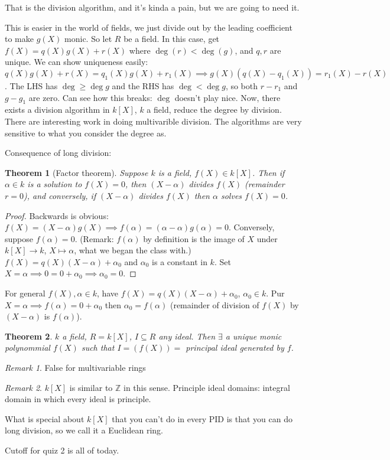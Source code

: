 \documentclass{article}
\theoremstyle{plain}
\newtheorem{theorem}{Theorem}
\theoremstyle{remark}
\newtheorem{remark}{Remark}
\newcommand{\Z}{{\mathbb Z}}
\begin{document}
That is the division algorithm, and it's kinda a pain,
but we are going to need it.

This is easier in the world of fields, we just divide out by the
leading coefficient to make $g(X)$ monic.
So let $R$ be a field.
In this case, get $f(X) = q(X)g(X) + r(X)$ where $\deg(r)<\deg(g)$,
and $q,r$ are unique.
We can show uniqueness easily:
$q(X)g(X) + r(X) = q_1(X)g(X) + r_1(X)
\implies g(X)(q(X)-q_1(X)) = r_1(X) - r(X)$.
The LHS has $\deg \geq \deg g$ and the RHS has $\deg < \deg g$,
so both $r-r_1$ and $g-g_1$ are zero.
Can see how this breaks: $\deg$ doesn't play nice.
Now, there exists a division algorithm in $k[X]$, $k$ a field,
reduce the degree by division.
There are interesting work in doing multivarible division.
The algorithms are very sensitive to what you consider the degree as.

Consequence of long division:
\begin{theorem}[Factor theorem]
	Suppose $k$ is a field, $f(X) \in k[X]$.
	Then if $\alpha \in k$ is a solution to $f(X) = 0$,
	then $(X-\alpha)$ divides $f(X)$ (remainder $r = 0$),
	and conversely, if $(X-\alpha)$ divides $f(X)$ then $\alpha$ solves $f(X) = 0$.
\end{theorem}
\begin{proof}
	Backwards is obvious: $f(X) = (X-\alpha)g(X) \implies f(\alpha) = (\alpha-\alpha)g(\alpha) = 0$.
	Conversely, suppose $f(\alpha) = 0$.
	(Remark: $f(\alpha)$ by definition is the image of $X$ under $k[X] \to k$, $X \mapsto \alpha$,
	what we began the class with.)
	$f(X) = q(X)(X-\alpha) + \alpha_0$ and $\alpha_0$ is a constant in $k$.
	Set $X = \alpha \implies 0 = 0 + \alpha_0 \implies \alpha_0 = 0$.
\end{proof}

For general $f(X), \alpha \in k$,
have $f(X) = q(X)(X-\alpha) + \alpha_0$, $\alpha_0 \in k$.
Pur $X = \alpha \implies f(\alpha) = 0 + \alpha_0$ then $\alpha_0 = f(\alpha)$
(remainder of division of $f(X)$ by $(X-\alpha)$ is $f(\alpha)$).

\begin{theorem}
	$k$ a field, $R = k[X]$, $I \subseteq R$ any ideal.
	Then $\exists$ a unique monic polynommial $f(X)$
	such that $I = (f(X)) = $ principal ideal generated by $f$.
\end{theorem}
\begin{remark}
	False for multivariable rings
\end{remark}
\begin{remark}
	$k[X]$ is similar to $\Z$ in this sense.
	Principle ideal domains: integral domain in which every ideal is principle.
\end{remark}
What is special about $k[X]$ that you can't do in every PID is that
you can do long division, so we call it a Euclidean ring.

Cutoff for quiz 2 is all of today.
\end{document}

